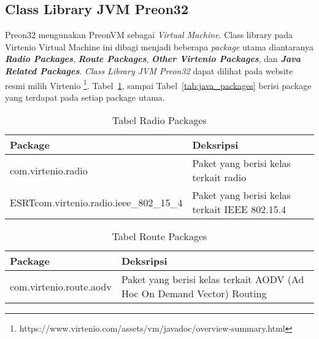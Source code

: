\subsection{Class Library JVM Preon32}
Preon32 mengunakan PreonVM sebagai \textit{Virtual Machine}. Class library pada Virtenio Virtual Machine ini dibagi menjadi beberapa \textit{package} utama diantaranya \textbf{\textit{Radio Packages}}, \textbf{\textit{Route Packages}}, \textbf{\textit{Other Virtenio Packages}}, dan \textbf{\textit{Java Related Packages}}. \textit{Class Library JVM Preon32} dapat dilihat pada website resmi milih Virtenio \footnote{https://www.virtenio.com/assets/vm/javadoc/overview-summary.html}. Tabel~\ref{tab:radio_packages}, sampai Tabel~\ref{tab:java_packages} berisi package yang terdapat pada setiap package utama.
		
\begin{table}[H] %
	\centering 
	\caption{Tabel Radio Packages}
	\label{tab:radio_packages}
	\begin{tabular}{|p{8cm}|p{8cm}|}
	\hline
		Package & Deksripsi \\
    \hline
		com.virtenio.radio & Paket yang berisi kelas terkait radio \\
		ESRTcom.virtenio.radio.ieee\_802\_15\_4  & Paket yang berisi kelas terkait IEEE 802.15.4 \\

		\hline
		
	\end{tabular} 
\end{table}

\begin{table}[H] %
	\centering 
	\caption{Tabel Route Packages}
	\label{tab:route_packages}
	\begin{tabular}{|p{5cm}|p{11cm}|}
		\hline
		Package & Deksripsi \\

		\hline
		com.virtenio.route.aodv & Paket yang berisi kelas terkait AODV (Ad Hoc On Demand Vector) Routing \\

		\hline
		
	\end{tabular} 
\end{table}

